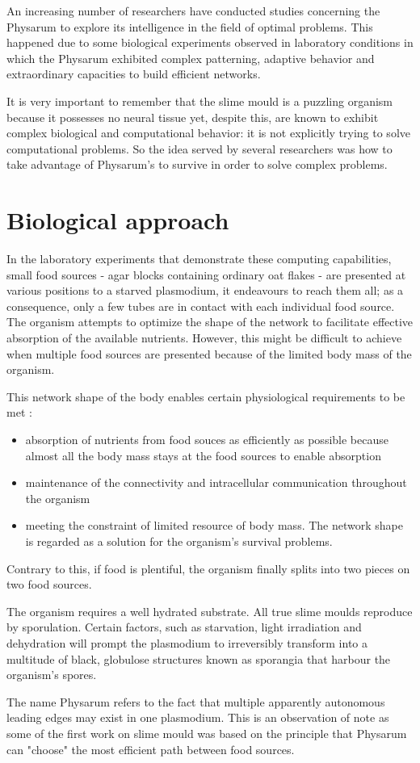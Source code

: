 An increasing number of researchers have conducted studies concerning the Physarum to explore its intelligence in the field of optimal problems. This happened due to some biological experiments observed in laboratory conditions in which the Physarum exhibited complex patterning, adaptive behavior and extraordinary capacities to build efficient networks.
\par
It is very important to remember that the slime mould is a puzzling organism because it possesses no neural tissue yet, despite this, are known to exhibit complex biological and computational behavior: it is not explicitly trying to solve computational problems. So the idea served by several researchers was how to take advantage of Physarum’s to survive in order to solve complex problems. 

\section{Biological approach}
In the laboratory experiments that demonstrate these computing capabilities, small food sources - agar blocks containing ordinary oat flakes - are presented at various positions to a starved plasmodium, it endeavours to reach them all; as a consequence, only a few tubes are in contact with each individual food source.  The organism attempts to optimize the shape of the network to facilitate effective absorption of the available nutrients. However, this might be difficult to achieve when multiple food sources are presented because of the limited body mass of the organism.
\par
This network shape of the body enables certain physiological requirements to be met \cite{nakagaki2004obtaining}:
\begin{itemize}
	\item absorption of nutrients from food souces as efficiently as possible because almost all the body mass stays at the food sources to enable absorption
	\item maintenance of the connectivity and intracellular communication throughout the organism
	\item meeting the constraint of limited resource of body mass. The network shape is regarded as a solution for the
organism’s survival problems.
\end{itemize}

Contrary to this, if food is plentiful, the organism finally splits into two pieces on two food sources.

\par
The organism requires a well hydrated substrate. All true slime moulds reproduce by sporulation. Certain factors, such as starvation, light irradiation and dehydration will prompt the plasmodium to irreversibly transform into a multitude of black, globulose structures known as sporangia that harbour the organism’s spores.
\par
The name Physarum refers to the fact that multiple apparently autonomous leading edges may exist in one plasmodium. This is an observation of note as some of the first work on slime mould was based on the principle that Physarum can "choose" the most efficient path between food sources.

